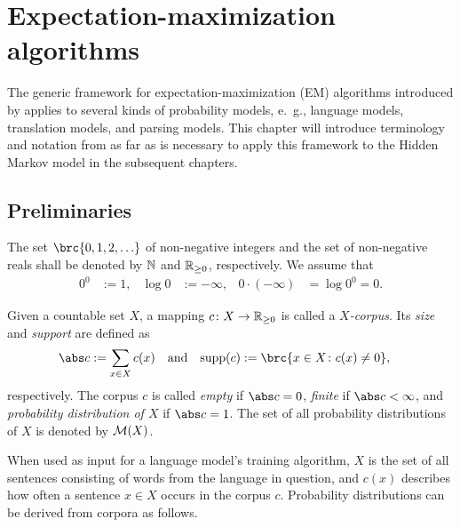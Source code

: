 \chapter{Expectation-maximization algorithms}


The generic framework for expectation-maximization (EM) algorithms introduced
by \cite{bucstuvog15} applies to several kinds of probability models, e.~g.,
language models, translation models, and parsing models.
This chapter will introduce terminology and notation from \cite{bucstuvog15} as
far as is necessary to apply this framework to the Hidden Markov model in the
subsequent chapters.

\section{Preliminaries}

The set $\brc{0,1,2,\ldots}$ of non-negative integers and the set of
non-negative reals shall be denoted by $\mathbb N$ and $\mathbb R_{\geq0}$, respectively.
We assume that
\begin{align*}
 0^0 &:= 1, &
 \log 0 &:= -\infty, &
 0 \cdot (-\infty) &= \log 0^0 = 0.
\end{align*}

\begin{definition}
 Given a countable set $X$, a mapping $c\colon X \to \mathbb R_{\geq0}$ is called a
 \emph{$X$-corpus}. Its \emph{size} and \emph{support} are defined as
 \begin{align*}
  \abs c &:= \sum_{x\in X} c(x) &
  \text{and} &&
  \operatorname{supp}(c) &:= \brc{x\in X\colon c(x)\neq0},
 \end{align*}
 respectively. The corpus $c$ is called \emph{empty} if $\abs c = 0$, \emph{finite} if
 $\abs c<\infty$, and \emph{probability distribution of $X$} if $\abs c = 1$.
 The set of all probability distributions of $X$ is denoted by $\mathcal M(X)$.
\end{definition}

When used as input for a language model's training algorithm, $X$ is the set of
all sentences consisting of words from the language in question, and $c(x)$
describes how often a sentence $x\in X$ occurs in the corpus $c$.
Probability distributions can be derived from corpora as follows.

